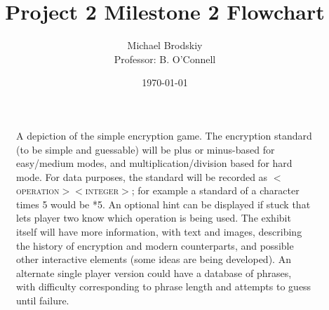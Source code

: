 


\hypersetup{
colorlinks=true,
linkcolor=black,
filecolor=black,      
urlcolor=black,
citecolor=black,
}

\title{Project 2 Milestone 2 Flowchart}
\date{\today}
\author{Michael Brodskiy\\ \small Professor: B. O'Connell}



\maketitle

\begin{figure}[H]
  \centering
  
  \caption{A depiction of the simple encryption game. The encryption standard (to be simple and guessable) will be plus or minus-based for easy/medium modes, and multiplication/division based for hard mode. For data purposes, the standard will be recorded as $<$\textsc{operation}$><$\textsc{integer}$>$; for example a standard of a character times 5 would be *5. An optional hint can be displayed if stuck that lets player two know which operation is being used. The exhibit itself will have more information, with text and images, describing the history of encryption and modern counterparts, and possible other interactive elements (some ideas are being developed). An alternate single player version could have a database of phrases, with difficulty corresponding to phrase length and attempts to guess until failure.}
  \label{fig:1}
\end{figure}



